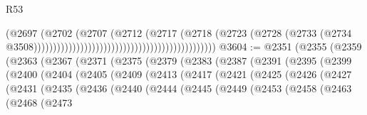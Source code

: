 \begin{lexlean}{R53}
\begin{coremodule}
                                                                              (@2697
                                                                                (@2702
                                                                                  (@2707
                                                                                    (@2712
                                                                                      (@2717
                                                                                        (@2718
                                                                                          (@2723
                                                                                            (@2728
                                                                                              (@2733
                                                                                                (@2734
                                                                                                  @3508)))))))))))))))))))))))))))))))))))))))))))))))
@3604 := @2351
    (@2355
      (@2359
        (@2363
          (@2367
            (@2371
              (@2375
                (@2379
                  (@2383
                    (@2387
                      (@2391
                        (@2395
                          (@2399
                            (@2400
                              (@2404
                                (@2405
                                  (@2409
                                    (@2413
                                      (@2417
                                        (@2421
                                          (@2425
                                            (@2426
                                              (@2427
                                                (@2431
                                                  (@2435
                                                    (@2436
                                                      (@2440
                                                        (@2444
                                                          (@2445
                                                            (@2449
                                                              (@2453
                                                                (@2458
                                                                  (@2463
                                                                    (@2468
                                                                      (@2473

\end{coremodule}
\end{lexlean}
